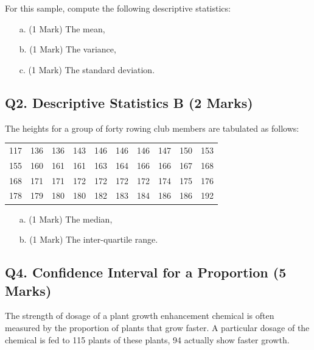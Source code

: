 \documentclass[a4paper,12pt]{article}
\begin{document}
\noindent For this sample, compute the following descriptive statistics:
\begin{itemize}
	\item[a.] (1 Mark) The mean,
	\item[b.] (1 Mark) The variance,
	\item[c.] (1 Mark) The standard deviation.
\end{itemize}

\subsection*{Q2. Descriptive Statistics B (2 Marks)} %
The heights for a group of forty rowing club members are tabulated as follows:

\begin{table}[ht]
	\begin{center}
		\begin{tabular}{|rrrrrrrrrr|}
			
			\hline
			117& 136& 136& 143& 146& 146& 146& 147& 150& 153\\
			155& 160& 161& 161& 163& 164& 166& 166& 167& 168\\
			168& 171& 171& 172& 172& 172& 172& 174& 175& 176\\
			178& 179& 180& 180& 182& 183& 184& 186& 186& 192\\
			\hline
		\end{tabular}
	\end{center}
\end{table}
\vspace{-0.5cm}
\begin{itemize}
	\item[a.] (1 Mark) The median,
	\item[b.] (1 Mark) The inter-quartile range.
\end{itemize}




\subsection*{Q4. Confidence Interval for a Proportion (5 Marks)}
The strength of dosage of a plant growth enhancement chemical is often measured by the proportion of plants that grow faster. A particular dosage of the chemical is fed to 115 plants of these plants, 94 actually show faster growth.
\end{document}
